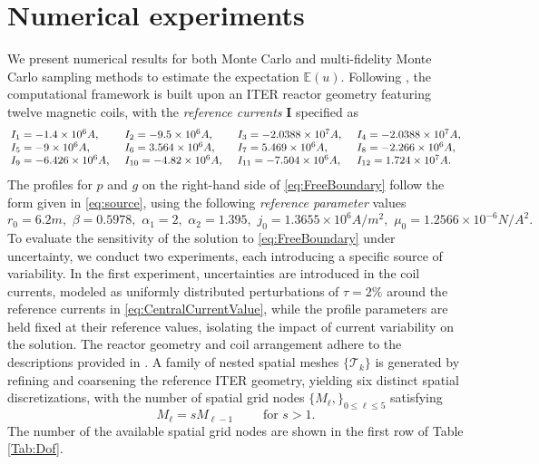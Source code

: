 \section{Numerical experiments}\label{sec:Num-Exp}
%
We present numerical results for both Monte Carlo and multi-fidelity Monte Carlo sampling methods to estimate the expectation $\mathbb{E}(u)$. Following \cite{FaHe:2017}, the computational framework is built upon an ITER reactor geometry featuring twelve magnetic coils, with the \textit{reference currents} $\boldsymbol{I}$ specified as
%
\begin{equation}\label{eq:CentralCurrentValue}
{\renewcommand{\arraycolsep}{2pt}
\begin{array}{llll}
I_1 = -1.4 \times 10^{6} A, \quad & I_2 = -9.5 \times 10^{6} A, \quad & I_3 = -2.0388 \times 10^{7} A, \quad & I_4 = -2.0388 \times 10^{7} A, \\
I_5 = -9 \times 10^{6} A, \quad & I_6 = 3.564 \times 10^{6} A, \quad & I_7 = 5.469 \times 10^{6} A, \quad & I_8 = -2.266 \times 10^{6} A, \\
I_9 = -6.426 \times 10^{6} A, \quad & I_{10} = -4.82 \times 10^{6} A, \quad & I_{11} = -7.504 \times 10^{6} A, \quad & I_{12} = 1.724 \times 10^{7} A. 
\end{array}
}
\end{equation}
%
The profiles for $p$ and $g$ on the right-hand side of \eqref{eq:FreeBoundary} follow the form given in \eqref{eq:source}, using the following \textit{reference parameter} values
%
\begin{equation}\label{eq:CentralParameterValue}
r_0=6.2m,\,\,\beta=0.5978, \,\, \alpha_1 = 2, \,\,  \alpha_2=1.395, \,\, j_0=1.3655 \times 10^6 A/m^2,\,\,  \mu_0=1.2566\times 10^{-6} N/A^2.
\end{equation}
%
To evaluate the sensitivity of the solution to \eqref{eq:FreeBoundary} under uncertainty, we conduct two experiments, each introducing a specific source of variability. In the first experiment, uncertainties are introduced in the coil currents, modeled as uniformly distributed perturbations of $\tau = 2\%$ around the reference currents in \eqref{eq:CentralCurrentValue}, while the profile parameters are held fixed at their reference values, isolating the impact of current variability on the solution. The reactor geometry and coil arrangement adhere to the descriptions provided in \cite{Amoskov:2009}.  A family of nested spatial meshes $\{\mathcal{T}_k\}$ is generated by refining and coarsening the reference ITER geometry, yielding six distinct spatial discretizations, with the number of spatial grid nodes $\{M_\ell,\}_{0\le \ell \le 5}$  satisfying
%
\begin{equation}
\label{eq:MeshGrowth}
M_\ell = s M_{\ell-1} \qquad \text{ for } s>1.
\end{equation}
%
The number of the available spatial grid nodes are shown in the first row of Table \ref{Tab:Dof}.

